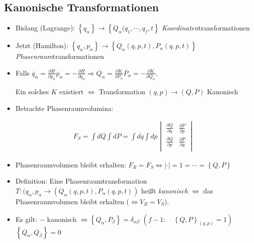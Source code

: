\subsection{Kanonische Transformationen}
\begin{itemize}
\item Bislang (Lagrange):
  $\left\{ q_{\alpha}\right\}\rightarrow \left\{
    Q_{\alpha}(q_1,\cdots,q_f,t \right\}$
  \emph{Koordinaten}transformationen
\item Jetzt (Hamilton):
  $\left\{ q_{\alpha}, p_{\alpha} \right\} \rightarrow \left\{
    Q_{\alpha}(q,p,t), P_{\alpha}(q,p,t) \right\}$
  \emph{Phasenraum}transformationen
\item Falls
  $\dot{q_{\alpha}} = \frac{\partial H}{\partial p_{\alpha}}
  \dot{p_{\alpha}} = -\frac{\partial H}{\partial q_{\alpha}}
  \Rightarrow \dot{Q_{\alpha}} = \frac{\partial K}{\partial
    P_{\alpha}} \dot{P_{\alpha}} = -\frac{\partial K}{\partial
    Q_{\alpha}}$.

  Ein solches $K$ existiert $\Leftrightarrow$ Transformation
  $(q,p) \rightarrow(Q,P)$ Kanonisch
\item Betrachte Phasenraumvolumina:

\begin{align*}
F_S = \int d Q \int dP = \int dq \int dp \begin{vmatrix}
\frac{\partial Q}{\partial q} & \frac{\partial P}{\partial p} \\
\frac{\partial Q}{\partial p} & \frac{\partial P}{\partial q} \\
\end{vmatrix}
\end{align*}

\item Phasenraumvolumen bleibt erhalten:
  $F_R = F_S \Leftrightarrow \left| \cdot \right| = 1 = \cdots =
  \left\{ Q,P \right\}$

\item Definition: Eine Phasenraumtransformation
  $T: (q_{\alpha}, p_{\alpha} \rightarrow (Q_{\alpha}(q,p,t),
  P_{\alpha}(q,p,t))$
  heißt \emph{kanonisch} $\Leftrightarrow$ das Phasenraumvolumen
  bleibt erhalten ($\Leftrightarrow V_R=V_S$).

\item Es gilt: $-$ kanonisch
  $\Leftrightarrow \left\{ Q_{\alpha},P_{\beta} \right\} =
  \delta_{\alpha\beta} $
  $ \left( f-1:\quad \left\{ Q,P \right\}_{(q,p)} = 1 \right) $
  $\left\{ Q_{\alpha}, Q_{\beta} \right\} = 0$


\end{itemize}
